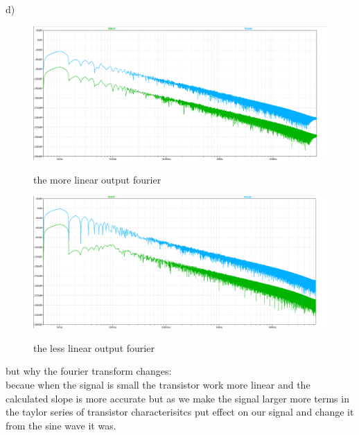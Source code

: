 \documentclass[11pt]{article}
\begin{document}
d)
\begin{figure}[H]
    \begin{center}
        \includegraphics[scale=0.45]{Fig/fourier-linear.png}
        \label{fig:linearFourier}
        \caption{the more linear output fourier}
    \end{center}
\end{figure}

\begin{figure}[H]
    \begin{center}
        \includegraphics[scale=0.45]{Fig/fourier-non-linear.png}
        \label{fig:nonlinearFourier}
        \caption{the less linear output fourier}
    \end{center}
\end{figure}
but why the fourier transform changes: \\
becaue when the signal is small the transistor work more linear and the calculated slope is
more accurate but as we make the signal larger more terms in the taylor series of transistor characterisitcs
put effect on our signal and change it from the sine wave it was.
\end{document}
